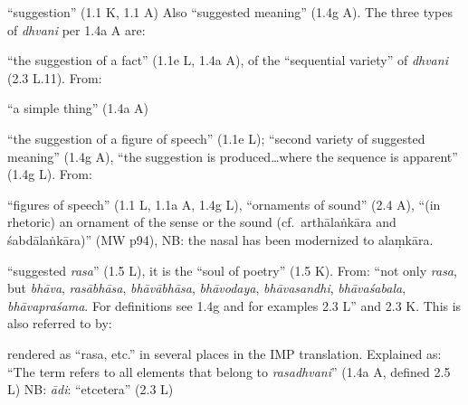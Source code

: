 \documentclass[10pt]{article}
\begin{document}
\begin{multicols}{2}
\begin{enumerate}[
			leftmargin=0em,
			rightmargin=0em,
		]
		 ``suggestion'' (1.1 K, 1.1 A) Also ``suggested meaning'' (1.4g A).
		The three types of \textit{dhvani} per 1.4a A are:
		\begin{enumerate}

			 ``the suggestion of a fact'' (1.1e L, 1.4a A), %
			of the ``sequential variety'' of \textit{dhvani} (2.3 L.11).
			From:
			\begin{itemize}
				 ``a simple thing'' (1.4a A)
			\end{itemize}

			 ``the suggestion of a figure of speech'' (1.1e L);
			``second variety of suggested meaning'' (1.4g A),
			``the suggestion is produced\dots where the sequence is apparent'' (1.4g L). %
			From:
			\begin{itemize}
				 ``figures of speech'' (1.1 L, 1.1a A, 1.4g L),
				``ornaments of sound'' (2.4 A),
				``(in rhetoric) an ornament of the sense or the sound (cf.\ arthālaṅkāra and śabdālaṅkāra)'' (MW p94),
				NB: the nasal has been modernized to alaṃkāra.
			\end{itemize}
			

			 ``suggested \textit{rasa}'' (1.5 L),
			it is the ``soul of poetry'' (1.5 K).
			From: ``not only \textit{rasa},
			but \textit{bhāva}, %
			\textit{rasābhāsa}, %
			\textit{bhāvābhāsa}, %
			\textit{bhāvodaya}, %
			\textit{bhāvasandhi}, %
			\textit{bhāvaśabala}, %
			\textit{bhāvapraśama}. %
			For definitions see 1.4g and for examples 2.3 L''
			and 2.3 K. %
			This is also referred to by:
			\begin{itemize}
				 rendered as ``rasa, etc.'' in several places in the IMP translation.
				Explained as: ``The term refers to all elements that belong to \textit{rasadhvani}'' (1.4a A, defined 2.5 L) %
				NB: \textit{ādi}: ``etcetera'' (2.3 L)%
				

\end{itemize}
\end{enumerate}
\end{enumerate}
\end{multicols}
\end{document}
